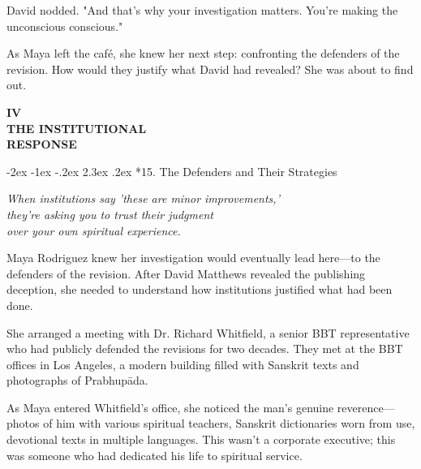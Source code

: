 \documentclass[12pt,twoside]{book}
\makeatletter
\def\cleardoublepage{\clearpage\if@twoside \ifodd\c@page\else\hbox{}\thispagestyle{empty}\newpage\if@twocolumn\hbox{}\newpage\fi\fi\fi}
\renewcommand\section{\@startsection{section}{1}{\z@}%
{-2ex \@plus -1ex \@minus -.2ex}%
{2.3ex \@plus.2ex}%
{\normalfont\Large\bfseries}}
\makeatother
\begin{document}
David nodded. "And that's why your investigation matters. You're making the unconscious conscious."

As Maya left the café, she knew her next step: confronting the defenders of the revision. How would they justify what David had revealed? She was about to find out.

\cleardoublepage
\thispagestyle{empty}
\vspace*{0.20\textheight}
\begin{center}
{\Huge\bfseries\MakeUppercase{\textbf{IV}}}\\[0.5cm]
{\huge\bfseries THE INSTITUTIONAL}\\[0.5cm]
{\huge\bfseries RESPONSE}
\end{center}
\vspace*{\fill}
\clearpage
\thispagestyle{empty} %
\mbox{}
\newpage

\cleardoublepage
\vspace*{0.20\textheight}
\section*{15. The Defenders and Their Strategies}
\thispagestyle{chapterpage}

{\centering\itshape When institutions say 'these are minor improvements,'\\they're asking you to trust their judgment\\over your own spiritual experience.\par}
\vspace{0.3cm}

\normalfont\justifying
Maya Rodriguez knew her investigation would eventually lead here—to the defenders of the revision. After David Matthews revealed the publishing deception, she needed to understand how institutions justified what had been done.

She arranged a meeting with Dr. Richard Whitfield, a senior BBT representative who had publicly defended the revisions for two decades. They met at the BBT offices in Los Angeles, a modern building filled with Sanskrit texts and photographs of Prabhupāda.

As Maya entered Whitfield's office, she noticed the man's genuine reverence—photos of him with various spiritual teachers, Sanskrit dictionaries worn from use, devotional texts in multiple languages. This wasn't a corporate executive; this was someone who had dedicated his life to spiritual service.
\end{document}
